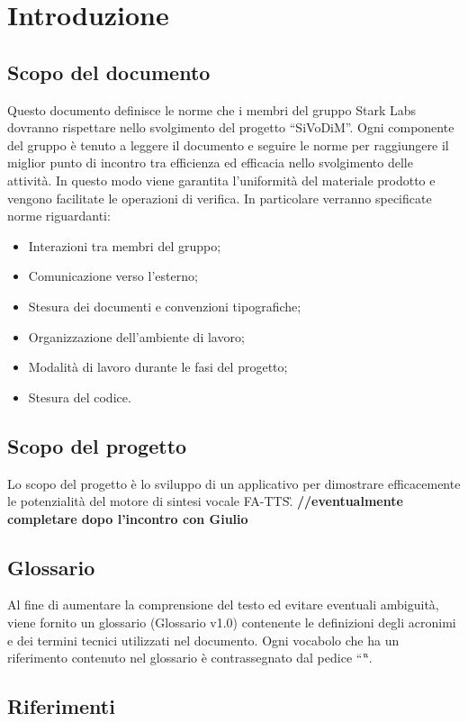 \section{Introduzione}

\subsection{Scopo del documento}
Questo documento definisce le norme che i membri del gruppo Stark Labs dovranno 
rispettare nello svolgimento del progetto “SiVoDiM”.
Ogni componente del gruppo è tenuto a leggere il documento e seguire le norme 
per raggiungere il miglior punto di incontro tra efficienza ed efficacia nello 
svolgimento delle attività. In questo modo viene garantita l'uniformità del 
materiale prodotto e vengono facilitate le operazioni di verifica. 
In particolare verranno specificate norme riguardanti:
\begin{itemize}
\item	Interazioni tra membri del gruppo;
\item	Comunicazione verso l'esterno;
\item	Stesura dei documenti e convenzioni tipografiche;
\item	Organizzazione dell'ambiente di lavoro;
\item	Modalità di lavoro durante le fasi del progetto;
\item	Stesura del codice.
\end{itemize}

\subsection{Scopo del progetto}
Lo scopo del progetto è lo sviluppo di un applicativo per dimostrare 
efficacemente le potenzialità del motore di sintesi vocale FA-TTS\G.  
\textbf{//eventualmente completare dopo l'incontro con Giulio}

\subsection{Glossario}
Al fine di aumentare la comprensione del testo ed evitare eventuali ambiguità, 
viene fornito un glossario (Glossario v1.0) contenente le definizioni degli 
acronimi e dei termini tecnici utilizzati nel documento. Ogni vocabolo che ha 
un riferimento contenuto nel glossario è contrassegnato dal pedice “\G “.

\subsection{Riferimenti}

